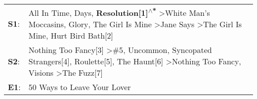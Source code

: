 \begin{supertabular}{p{0.03\textwidth}p{0.92\textwidth}}
 \textbf{S1}:  &  All In Time\textsuperscript{},  Days\textsuperscript{}, \enspace \textbf{Resolution[1]\textsuperscript{$\wedge$*}} \textgreater \enspace White Man's Moccasins\textsuperscript{}, \enspace Glory\textsuperscript{}, \enspace The Girl Is Mine\textsuperscript{} \textgreater \enspace Jane Says\textsuperscript{} \textgreater \enspace The Girl Is Mine\textsuperscript{}, \enspace Hurt Bird Bath[2]\textsuperscript{}  \enspace  \\
 \textbf{S2}:  &                       Nothing Too Fancy[3]\textsuperscript{} \textgreater \enspace \#5\textsuperscript{}, \enspace Uncommon\textsuperscript{}, \enspace Syncopated Strangers[4]\textsuperscript{}, \enspace Roulette[5]\textsuperscript{}, \enspace The Haunt[6]\textsuperscript{} \textgreater \enspace Nothing Too Fancy\textsuperscript{}, \enspace Visions\textsuperscript{} \textgreater \enspace The Fuzz[7]\textsuperscript{}  \enspace  \\
 \textbf{E1}:  &                                                                                                                                                                                                                                                                                                                                                                                        50 Ways to Leave Your Lover\textsuperscript{}  \enspace  \\
\end{supertabular}
